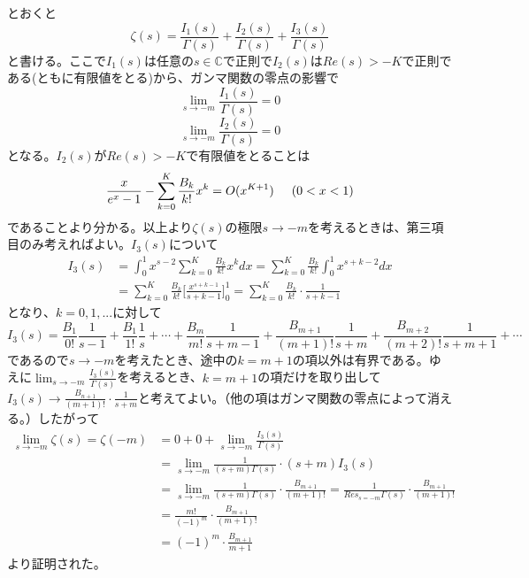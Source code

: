 \documentclass{jsarticle}
\begin{document}
とおくと
\[\zeta(s)=\frac{I_{1}(s)}{\Gamma(s)}+\frac{I_{2}(s)}{\Gamma(s)}+\frac{I_{3}(s)}{\Gamma(s)}\]
と書ける。ここで\(I_{1}(s)\)は任意の\(s\in\mathbb{C}\)で正則で\(I_{2}(s)\)は\(Re(s)>-K\)で正則である(ともに有限値をとる)から、ガンマ関数の零点の影響で
\[\lim_{s\to-m}\frac{I_{1}(s)}{\Gamma(s)}=0\]
\[\lim_{s\to-m}\frac{I_{2}(s)}{\Gamma(s)}=0\]
となる。\(I_{2}(s)\)が\(Re(s)>-K\)で有限値をとることは
\[\frac{x}{e^{x}-1}-\sum_{k=0}^{K}\frac{B_{k}}{k!}x^{k}=O(x^{K+1})\hspace{5mm}(0<x<1)\]
であることより分かる。以上より\(\zeta(s)\)の極限\(s\to-m\)を考えるときは、第三項目のみ考えればよい。\(I_{3}(s)\)について
\begin{align*}
I_{3}(s)&=\int_{0}^{1}x^{s-2}\sum_{k=0}^{K}\frac{B_{k}}{k!}x^{k}dx
=\sum_{k=0}^{K}\frac{B_{k}}{k!}\int_{0}^{1}x^{s+k-2}dx\\
&=\sum_{k=0}^{K}\frac{B_{k}}{k!}\Biggl[\frac{x^{s+k-1}}{s+k-1}\Biggr]_{0}^{1}
=\sum_{k=0}^{K}\frac{B_{k}}{k!}\cdot\frac{1}{s+k-1}
\end{align*}
となり、\(k=0,1,...\)に対して
\[I_{3}(s)=\frac{B_{1}}{0!}\frac{1}{s-1}+\frac{B_{1}}{1!}\frac{1}{s}+\cdots+\frac{B_{m}}{m!}\frac{1}{s+m-1}+\frac{B_{m+1}}{(m+1)!}\frac{1}{s+m}+\frac{B_{m+2}}{(m+2)!}\frac{1}{s+m+1}+\cdots\]
であるので\(s\to-m\)を考えたとき、途中の\(k=m+1\)の項以外は有界である。ゆえに\(\displaystyle\lim_{s\to-m}\frac{I_{3}(s)}{\Gamma(s)}\)を考えるとき、\(k=m+1\)の項だけを取り出して\(I_{3}(s)\to\frac{B_{n+1}}{(m+1)!}\cdot\frac{1}{s+m}\)と考えてよい。（他の項はガンマ関数の零点によって消える。）したがって
\begin{align*}
\lim_{s\to-m}\zeta(s)=\zeta(-m)&=0+0+\lim_{s\to-m}\frac{I_{3}(s)}{\Gamma(s)}\\
&=\lim_{s\to-m}\frac{1}{(s+m)\Gamma(s)}\cdot(s+m)I_{3}(s)\\
&=\lim_{s\to-m}\frac{1}{(s+m)\Gamma(s)}\cdot\frac{B_{m+1}}{(m+1)!}=\frac{1}{Res_{s=-m}\Gamma(s)}\cdot\frac{B_{m+1}}{(m+1)!}\\
&=\frac{m!}{(-1)^{m}}\cdot\frac{B_{m+1}}{(m+1)!}\\
&=(-1)^{m}\cdot\frac{B_{m+1}}{m+1}
\end{align*}
より証明された。








\setcounter{equation}{0}
\end{document}
